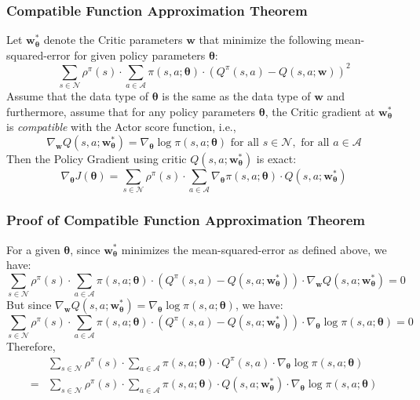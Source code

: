 \documentclass[handout]{beamer}
\begin{document}
\begin{frame}
\frametitle{Compatible Function Approximation Theorem}
\pause
\begin{theorem}
Let $\bm{w_{\theta}^*}$ denote the Critic parameters $\bm{w}$ that minimize the following mean-squared-error for given policy parameters $\bm{\theta}$:
$$\sum_{s \in \mathcal{N}} \rho^{\pi}(s) \cdot \sum_{a \in \mathcal{A}} \pi(s,a; \bm{\theta}) \cdot (Q^{\pi}(s,a) - Q(s,a;\bm{w}))^2$$
Assume that the data type of $\bm{\theta}$ is the same as the data type of $\bm{w}$ and furthermore, assume that for any policy parameters $\bm{\theta}$, the Critic gradient at $\bm{w_{\theta}^*}$ is {\em compatible} with the Actor score function, i.e., 
$$\nabla_{\bm{w}} Q(s,a;\bm{w_{\theta}^*}) = \nabla_{\bm{\theta}} \log \pi(s,a;\bm{\theta}) \text{ for all } s \in \mathcal{N}, \text{ for all } a \in \mathcal{A}$$ 
Then the Policy Gradient using critic $Q(s,a;\bm{w_{\theta}^*})$ is exact:
$$\nabla_{\bm{\theta}} J(\bm{\theta}) = \sum_{s \in \mathcal{N}} \rho^{\pi}(s) \cdot \sum_{a \in \mathcal{A}} \nabla_{\bm{\theta}} \pi(s, a; \bm{\theta}) \cdot Q(s,a; \bm{w_{\theta}^*})$$
\end{theorem}
\end{frame}

\begin{frame}
\frametitle{Proof of Compatible Function Approximation Theorem}
\pause
For a given $\bm{\theta}$, since $\bm{w_{\theta}^*}$ minimizes the mean-squared-error as defined above, we have:
$$\sum_{s \in \mathcal{N}} \rho^{\pi}(s) \cdot \sum_{a \in \mathcal{A}} \pi(s,a; \bm{\theta}) \cdot (Q^{\pi}(s,a) - Q(s,a;\bm{w_{\theta}^*})) \cdot \nabla_{\bm{w}} Q(s,a;\bm{w_{\theta}^*}) = 0$$
\pause
But since $\nabla_{\bm{w}} Q(s,a;\bm{w_{\theta}^*}) = \nabla_{\bm{\theta}} \log \pi(s,a; \bm{\theta})$, we have:
$$\sum_{s \in \mathcal{N}} \rho^{\pi}(s) \cdot \sum_{a \in \mathcal{A}} \pi(s,a; \bm{\theta}) \cdot (Q^{\pi}(s,a) - Q(s,a;\bm{w_{\theta}^*})) \cdot \nabla_{\bm{\theta}} \log \pi(s,a; \bm{\theta}) = 0$$
\pause
Therefore,
\begin{align*}
& \sum_{s \in \mathcal{N}} \rho^{\pi}(s) \cdot \sum_{a \in \mathcal{A}} \pi(s,a; \bm{\theta}) \cdot Q^{\pi}(s,a) \cdot \nabla_{\bm{\theta}} \log \pi(s,a; \bm{\theta}) \\
= & \sum_{s \in \mathcal{N}} \rho^{\pi}(s) \cdot \sum_{a \in \mathcal{A}} \pi(s,a; \bm{\theta}) \cdot Q(s,a; \bm{w_{\theta}^*}) \cdot \nabla_{\bm{\theta}} \log \pi(s,a; \bm{\theta})\\
\end{align*}
\end{frame}
\end{document}
